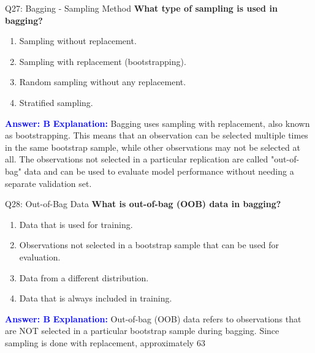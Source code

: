 \documentclass[8pt]{beamer}
\begin{document}
	\begin{frame}{Q27: Bagging - Sampling Method}
		\fontsize{6.5}{7.5}\selectfont
		\textbf{What type of sampling is used in bagging?}
		\begin{enumerate}
			\item Sampling without replacement.
			\item Sampling with replacement (bootstrapping).
			\item Random sampling without any replacement.
			\item Stratified sampling.
		\end{enumerate}
		\vspace{0.1cm}
		\textcolor{blue}{\textbf{Answer: B}}
		\vspace{0.1cm}
		\textcolor{blue}{\textbf{Explanation:}} Bagging uses sampling with replacement, also known as bootstrapping. This means that an observation can be selected multiple times in the same bootstrap sample, while other observations may not be selected at all. The observations not selected in a particular replication are called "out-of-bag" data and can be used to evaluate model performance without needing a separate validation set.
	\end{frame}
	
	\begin{frame}{Q28: Out-of-Bag Data}
		\fontsize{6.5}{7.5}\selectfont
		\textbf{What is out-of-bag (OOB) data in bagging?}
		\begin{enumerate}
			\item Data that is used for training.
			\item Observations not selected in a bootstrap sample that can be used for evaluation.
			\item Data from a different distribution.
			\item Data that is always included in training.
		\end{enumerate}
		\vspace{0.1cm}
		\textcolor{blue}{\textbf{Answer: B}}
		\vspace{0.1cm}
		\textcolor{blue}{\textbf{Explanation:}} Out-of-bag (OOB) data refers to observations that are NOT selected in a particular bootstrap sample during bagging. Since sampling is done with replacement, approximately 63%
	\end{frame}
	
\end{document}
